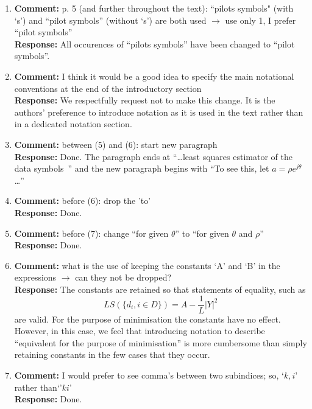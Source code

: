 \documentclass{article}
\newcommand{\abs}[1]{{\left\vert #1 \right\vert}}
\begin{document}
\begin{enumerate}
\item \textbf{Comment:} p. 5 (and further throughout the text): ``pilots symbols" (with `s') and ``pilot symbols'' (without `s') are both used $\to$ use only 1, I prefer ``pilot symbols'' \\
\textbf{Response:} All occurences of ``pilots symbols'' have been changed to ``pilot symbols''. 

\item \label{rev2:commentnotationsection} \textbf{Comment:} I think it would be a good idea to specify the main notational conventions at the end of the introductory section \\
\textbf{Response:} We respectfully request not to make this change.  It is the authors' preference to introduce notation as it is used in the text rather than in a dedicated notation section. %

\item \textbf{Comment:} between (5) and (6): start new paragraph \\
\textbf{Response:} Done.  The paragraph ends at ``\dots least squares estimator of the data symbols~\cite{Sweldens2001,Mackenthun1994}'' and the new paragraph begins with ``To see this, let $a = \rho e^{j\theta}$ \dots''

\item \textbf{Comment:} before (6): drop the 'to' \\
\textbf{Response:} Done.

\item \textbf{Comment:} before (7): change ``for given $\theta$'' to ``for given $\theta$ and $\rho$'' \\
\textbf{Response:} Done.

\item \textbf{Comment:} what is the use of keeping the constants `A' and `B' in the expressions $\to$ can they not be dropped? \\
\textbf{Response:} The constants are retained so that statements of equality, such as
\[
LS(\{d_i, i \in D\}) = A - \frac{1}{L}\abs{Y}^2
\]
are valid. For the purpose of minimisation the constants have no effect.  However, in this case, we feel that introducing notation to describe ``equivalent for the purpose of minimisation'' is more cumbersome than simply retaining constants in the few cases that they occur.

\item \textbf{Comment:} I would prefer to see comma's between two subindices; so, `$k,i$' rather than`'$ki$' \\
\textbf{Response:} Done.


\end{enumerate}
\end{document}

